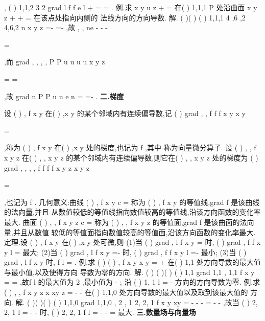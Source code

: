\circ 
\circ 
\circ 
\rho 
,
(
)
1,1,2
3 2
grad
l
f
f e
l
\partial 
+
=
\cdots 
=
\partial 
\rho 
. 
\textcolor{lyred}{例}.求
x
y
u
z
+
=
在(
)
1,1,1
P
处沿曲面
x
y
z
+
+
=
在该点处指向内侧的 
法线方向的方向导数. 
解.
(
)(
)
(
)
1,1,1
4 ,6 ,2
4,6,2
n
x
y
z
=-
=-
\rho 
,故
,
,
ne
-
-
-


=



\rho 
,而 
grad
,
,
,
,
P
P
u
u
u
u
x
y
z


\partial 
\partial 
\partial 


=
=
-




\partial 
\partial 
\partial 




,故
grad
n
P
P
u
u
e
n
\partial 
=
\cdots 
=-
\partial 
\rho 
. 
\vspace{4pt}
{\bfseries \textcolor{lyred}{二.梯度}}

设
(
)
,
f x y 在(
)
,x y 的某个邻域内有连续偏导数,记
(
)
grad
,
,
f
f
f x y
x
y


\partial 
\partial 
=

\partial 
\partial 


,称为 
(
)
,
f x y 在(
)
,x y 处的\textcolor{lyred}{梯度},也记为
f
\nabla 
\rho 
,其中\nabla 
\rho 
称为\textcolor{lyred}{向量微分算子}. 
设
(
)
, ,
f x y z 在(
)
, ,
x y z 的某个邻域内有连续偏导数,则它在(
)
, ,
x y z 处的\textcolor{lyred}{梯度}为 
(
)
grad
, ,
,
,
f
f
f
f x y z
x
y
z


\partial 
\partial 
\partial 
=

\partial 
\partial 
\partial 


,也记为
f
\nabla 
\rho 
. 
\textcolor{lyred}{几何意义}:曲线
(
)
,
f x y
c
=
称为
(
)
,
f x y 的\textcolor{lyred}{等值线},grad f 是该曲线的法向量,并且 
从数值较低的等值线指向数值较高的等值线,沿该方向函数的变化率最大. 
曲面
(
)
, ,
f x y z
c
=
称为
(
)
, ,
f x y z 的\textcolor{lyred}{等值面},grad f 是该曲面的法向量,并且从数值 
较低的等值面指向数值较高的等值面,沿该方向函数的变化率最大. 
\textcolor{lyred}{定理}.设
(
)
,
f x y 在(
)
,x y 处可微,则 
(1)当
(
)
grad
,
l
f x y
=
\rho 
时,
(
)
grad
,
f
f x y
l
\partial 
=
\partial 
最大; 
(2)当
(
)
grad
,
l
f x y
=-
\rho 
时,
(
)
grad
,
f
f x y
l
\partial 
=-
\partial 
最小; 
(3)当
(
)
grad
,
l
f x y
\bot
\rho 
时,
f
l
\partial 
=
\partial 
. 
\textcolor{lyred}{例}.求
(
)
(
)
,
f x y
x
y
=
+
在(
)
1,1 处方向导数的最大值与最小值,以及使得方向 
导数为零的方向. 
解.
(
)
(
)(
)
(
)
1,1
grad
1,1
,
1,1
f
x y
=
=
,故f
l
\partial 
\partial 的最大值为
2 ,最小值为
-
; 
沿
(
)
1, 1
l =\pm 
-
\rho 
方向的方向导数为零. 
\textcolor{lyred}{例}.求
(
)
, ,
f x y z
x
xy
z
=
-
-
在(
)
1,1,0 处方向导数的最大值以及取到该最大值的 
方向. 
解.
(
)(
)(
)
(
)
1,1,0
grad
1,1,0
, 2
, 1
2, 2, 1
f
x
y
xy
=
-
-
-
=
-
-
,故当
(
)
2, 2, 1
l =
-
-
\rho 
时, 
(
)
2, 2, 1
f
l
\partial 
=
-
-
=
\partial 
最大. 
\vspace{4pt}
{\bfseries \textcolor{lyred}{三.数量场与向量场}}

